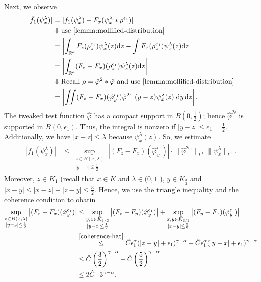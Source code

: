 Next, we observe
\begin{align*}
    |\bar f_1(\psi_x^\lambda)| &= |f_1(\psi_x^\lambda) - F_x(\psi_x^\lambda* \rho^{\epsilon_1})| \\
    &\Downarrow \text{use~\eqref{lemma:mollified-distribution}} \\
    &= \left | \int_{\mathbb{R}^d} F_z(\rho_z^{\epsilon_1}) \psi^\lambda_x(z)  \mathrm{d}z -  \int F_x(\rho_z^{\epsilon_1}) \psi^\lambda_x(z) \mathrm{d} z \right| \\
    &= \left | \int_{\mathbb{R}^d} (F_z - F_x)(\rho_z^{\epsilon_1}) \psi^\lambda_x(z)  \mathrm{d}z\right| \\
    &\Downarrow  \text{Recall \(\rho = \hat \varphi^2 * \hat \varphi\) and use~\eqref{lemma:mollified-distribution}} \\
    &= \left| \iint (F_z - F_x)(\hat \varphi^{\epsilon_1}_y) \hat \varphi^{2\epsilon_1}(y-z)\psi^\lambda_x(z) \; \mathrm{d}y \, \mathrm{d}z \right|.
\end{align*}
The tweaked test function \(\hat \varphi\) has a compact support in \(B(0, \frac{1}{2})\); hence \(\hat \varphi^{2\epsilon}\) is supported in \(B(0, \epsilon_1)\). Thus, the integral is nonzero if \(|y-z| \leq \epsilon_1 = \frac{1}{2}\). Additionally, we have \(|x-z|\leq \lambda\) because \(\psi^\lambda_x(z)\). So, we estimate
\begin{align*}
    |\bar f_1(\psi_x^\lambda)| &\leq  \sup_{\substack{z \in B(x, \lambda) \\ |y-z| \leq \frac{1}{2}}} \left| (F_z - F_x)(\hat \varphi^{\epsilon_1}_y) \right|  \cdot \lVert \hat \varphi^{2\epsilon_1} \rVert_{L^1} \lVert  \psi^{\lambda}_x \rVert_{L^1}.
\end{align*}
Moreover, \(z \in \bar K_1\) (recall that \(x \in K\) and \(\lambda \in (0,1]\)), \(y \in \bar K_{\frac{3}{2}}\) and \(|x-y| \leq |x-z| + |z-y| \leq \frac{3}{2}\). Hence, we use the triangle inequality and the coherence condition to obatin 
\begin{align*}
    \sup_{\substack{z \in B(x, \lambda) \\ |y-z| \leq
     \frac{1}{2}}} \left| (F_z - F_x)(\hat \varphi^{\epsilon_1}_y) \right| 
     &\leq \sup_{\substack{y, z \in \bar K_{3/2} \\ |y-z| \leq \frac{1}{2}}} \left| (F_z - F_y)(\hat \varphi^{\epsilon_1}_y) \right| + \sup_{\substack{x,y \in \bar K_{3/2} \\ |x-y| \leq \frac{3}{2}}} \left| (F_y - F_x)(\hat \varphi^{\epsilon_1}_y) \right| \\
     &\overset{\eqref{coherence-hat}}{\leq} \hat C \epsilon_1^\alpha(|z-y| + \epsilon_1)^{\gamma - \alpha} + \hat C \epsilon_1^\alpha(|y-x| + \epsilon_1)^{\gamma - \alpha}\\
     &\leq \hat C \left(\frac{3}{2}\right)^{\gamma - \alpha } + \hat C \left(\frac{5}{2}\right)^{\gamma - \alpha } \\
     &\leq 2\hat C \cdot  3^{\gamma - \alpha}.
\end{align*}
